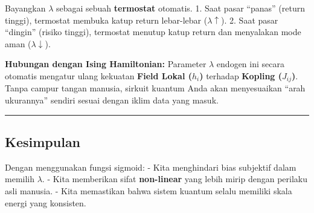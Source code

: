 Bayangkan \(\lambda\) sebagai sebuah \textbf{termostat} otomatis. 1. Saat pasar ``panas'' (return tinggi), termostat membuka katup return lebar-lebar (\(\lambda \uparrow\)). 2. Saat pasar ``dingin'' (risiko tinggi), termostat menutup katup return dan menyalakan mode aman (\(\lambda \downarrow\)).

\textbf{Hubungan dengan Ising Hamiltonian:} Parameter \(\lambda\) endogen ini secara otomatis mengatur ulang kekuatan \textbf{Field Lokal (\(h_i\))} terhadap \textbf{Kopling (\(J_{ij}\))}. Tanpa campur tangan manusia, sirkuit kuantum Anda akan menyesuaikan ``arah ukurannya'' sendiri sesuai dengan iklim data yang masuk.

\begin{center}\rule{0.5\linewidth}{0.5pt}\end{center}

\hypertarget{kesimpulan}{%
\subsection{Kesimpulan}\label{kesimpulan-b}}

Dengan menggunakan fungsi sigmoid: - Kita menghindari bias subjektif dalam memilih \(\lambda\). - Kita memberikan sifat \textbf{non-linear} yang lebih mirip dengan perilaku asli manusia. - Kita memastikan bahwa sistem kuantum selalu memiliki skala energi yang konsisten.
